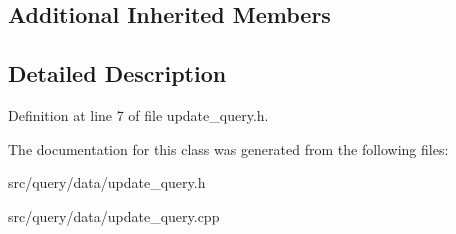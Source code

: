 \subsection*{Additional Inherited Members}


\subsection{Detailed Description}


Definition at line 7 of file update\+\_\+query.\+h.



The documentation for this class was generated from the following files\+:\begin{DoxyCompactItemize}
\item 
src/query/data/update\+\_\+query.\+h\item 
src/query/data/update\+\_\+query.\+cpp\end{DoxyCompactItemize}
